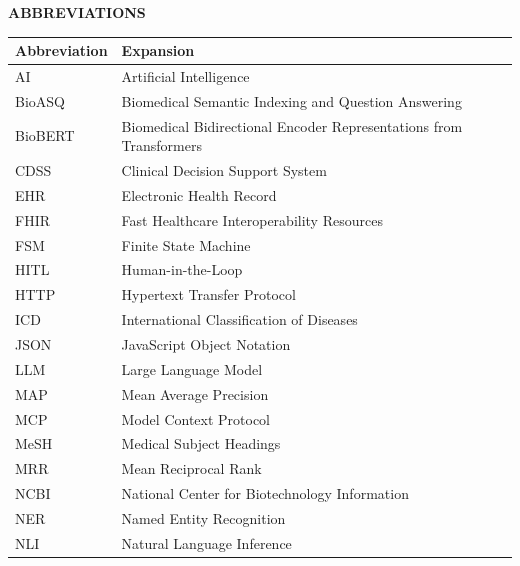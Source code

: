 \documentclass[12pt,a4paper]{report}
\begin{document}
\newpage
\tableofcontents

\newpage
\listoftables

\newpage
\listoffigures

\newpage
\begin{center}
    \textbf{\Large ABBREVIATIONS}\\[0.8cm]
\end{center}

\begin{table}[H]
\centering
\begin{tabularx}{\textwidth}{lX}
\toprule
\textbf{Abbreviation} & \textbf{Expansion} \\
\midrule
AI & Artificial Intelligence \\
BioASQ & Biomedical Semantic Indexing and Question Answering \\
BioBERT & Biomedical Bidirectional Encoder Representations from Transformers \\
CDSS & Clinical Decision Support System \\
EHR & Electronic Health Record \\
FHIR & Fast Healthcare Interoperability Resources \\
FSM & Finite State Machine \\
HITL & Human-in-the-Loop \\
HTTP & Hypertext Transfer Protocol \\
ICD & International Classification of Diseases \\
JSON & JavaScript Object Notation \\
LLM & Large Language Model \\
MAP & Mean Average Precision \\
MCP & Model Context Protocol \\
MeSH & Medical Subject Headings \\
MRR & Mean Reciprocal Rank \\
NCBI & National Center for Biotechnology Information \\
NER & Named Entity Recognition \\
NLI & Natural Language Inference \\

\end{tabularx}
\end{table}
\end{document}
